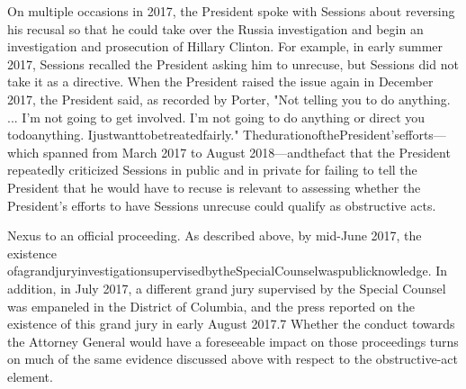 On multiple occasions in 2017, the President spoke with Sessions about reversing his recusal so that he could take over the Russia investigation and begin an investigation and prosecution of Hillary Clinton.
For example, in early summer 2017, Sessions recalled the President asking him to unrecuse, but Sessions did not take it as a directive.
When the President raised the issue again in December 2017, the President said, as recorded by Porter, "Not telling you to do anything. ...
I'm not going to get involved.
I'm not going to do anything or direct you todoanything.
Ijustwanttobetreatedfairly."
ThedurationofthePresident'sefforts—which spanned from March 2017 to August 2018—andthefact that the President repeatedly criticized Sessions in public and in private for failing to tell the President that he would have to recuse is relevant to assessing whether the President's efforts to have Sessions unrecuse could qualify as obstructive acts.

Nexus to an official proceeding.
As described above, by mid-June 2017, the existence ofagrandjuryinvestigationsupervisedbytheSpecialCounselwaspublicknowledge.
In addition, in July 2017, a different grand jury supervised by the Special Counsel was empaneled in the District of Columbia, and the press reported on the existence of this grand jury in early August 2017.7
Whether the conduct towards the Attorney General would have a foreseeable impact on those proceedings turns on much of the same evidence discussed above with respect to the obstructive-act element.

